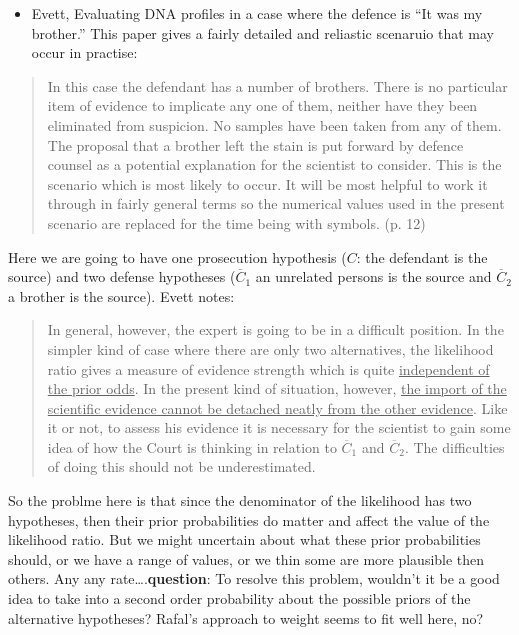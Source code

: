 \documentclass[
  10pt,
  dvipsnames,enabledeprecatedfontcommands]{scrartcl}
\providecommand{\tightlist}{%
  \setlength{\itemsep}{0pt}\setlength{\parskip}{0pt}}
\begin{document}
\begin{itemize}
\tightlist
\item
  Evett, Evaluating DNA profiles in a case where the defence is ``It was
  my brother.'' This paper gives a fairly detailed and reliastic
  scenaruio that may occur in practise:
\end{itemize}

\begin{quote}
In this case the defendant has a number of brothers. There is no particular
item of evidence to implicate any one of them, neither have they been
eliminated from suspicion. No samples have been taken from any of them.
The proposal that a brother left the stain is put forward by defence counsel
as a potential explanation for the scientist to consider.
This is the scenario which is most likely to occur. It will be most helpful to
work it through in fairly general terms so the numerical values used in the
present scenario are replaced for the time being with symbols. (p. 12)
\end{quote}

Here we are going to have one prosecution hypothesis (\(C\): the
defendant is the source) and two defense hypotheses (\(\overline{C}_1\)
an unrelated persons is the source and \(\overline{C}_2\) a brother is
the source). Evett notes:

\begin{quote}
In general, however, the expert is going to be in a difficult position. In the
simpler kind of case where there are only two alternatives, the likelihood
ratio gives a measure of evidence strength which is quite \underline{independent of the
prior odds}. In the present kind of situation, however, \underline{the import of the
scientific evidence cannot be detached neatly from the other evidence}. Like
it or not, to assess his evidence it is necessary for the scientist to gain some
idea of how the Court is thinking in relation to $\overline{C}_1$ and $\overline{C}_2$. The difficulties of
doing this should not be underestimated. 
\end{quote}


So the problme here is that since the denominator of the likelihood has
two hypotheses, then their prior probabilities do matter and affect the
value of the likelihood ratio. But we might uncertain about what these
prior probabilities should, or we have a range of values, or we thin
some are more plausible then others. Any any
rate\ldots.\textbf{question}: To resolve this problem, wouldn't it be a
good idea to take into a second order probability about the possible
priors of the alternative hypotheses? Rafal's approach to weight seems
to fit well here, no?
\end{document}

